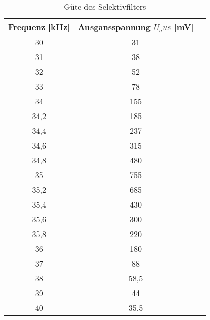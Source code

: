 \begin{table}[h]
	\begin{center}
		\begin{tabular}{ccc}
			Frequenz [kHz] & Ausgansspannung $U_aus$ [mV]\\ \hline
			30	&31\\
			31	&38\\
			32	&52\\
			33	&78\\
			34	&155\\
			34,2&185\\
			34,4&237\\
			34,6&315\\
			34,8&480\\
			35	&755\\
			35,2&685\\
			35,4&430\\
			35,6&300\\
			35,8&220\\
			36	&180\\
			37	&88\\
			38	&58,5\\
			39	&44\\
			40	&35,5\\
		\end{tabular}
		\caption{Güte des Selektivfilters}
		\label{taba}
	\end{center}
\end{table}